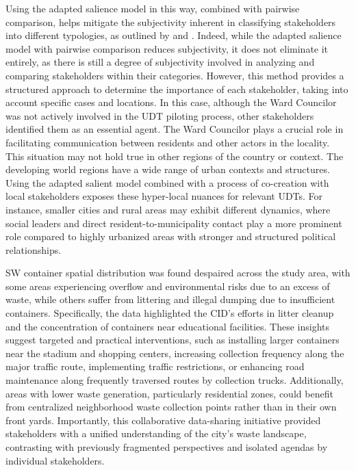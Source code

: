 \documentclass[authoryear,preprint,review,11pt,doubleblind]{elsarticle}
\begin{document}
    Using the adapted salience model in this way, combined with pairwise comparison, helps mitigate the subjectivity inherent in classifying stakeholders into different typologies, as outlined by \citet{Mitchell1997} and \citet{Shafique2022}. Indeed, while the adapted salience model with pairwise comparison reduces subjectivity, it does not eliminate it entirely, as there is still a degree of subjectivity involved in analyzing and comparing stakeholders within their categories. However, this method provides a structured approach to determine the importance of each stakeholder, taking into account specific cases and locations. In this case, although the Ward Councilor was not actively involved in the UDT piloting process, other stakeholders identified them as an essential agent. The Ward Councilor plays a crucial role in facilitating communication between residents and other actors in the locality. This situation may not hold true in other regions of the country or context. The developing world regions have a wide range of urban contexts and structures. Using the adapted salient model combined with a process of co-creation with local stakeholders exposes these hyper-local nuances for relevant UDTs. For instance, smaller cities and rural areas may exhibit different dynamics, where social leaders and direct resident-to-municipality contact play a more prominent role compared to highly urbanized areas with stronger and structured political relationships.

SW container spatial distribution was found despaired across the study area, with some areas experiencing overflow and environmental risks due to an excess of waste, while others suffer from littering and illegal dumping due to insufficient containers. Specifically, the data highlighted the CID's efforts in litter cleanup and the concentration of containers near educational facilities. These insights suggest targeted and practical interventions, such as installing larger containers near the stadium and shopping centers, increasing collection frequency along the major traffic route, implementing traffic restrictions, or enhancing road maintenance along frequently traversed routes by collection trucks. Additionally, areas with lower waste generation, particularly residential zones, could benefit from centralized neighborhood waste collection points rather than in their own front yards. Importantly, this collaborative data-sharing initiative provided stakeholders with a unified understanding of the city's waste landscape, contrasting with previously fragmented perspectives and isolated agendas by individual stakeholders.
    
\end{document}

